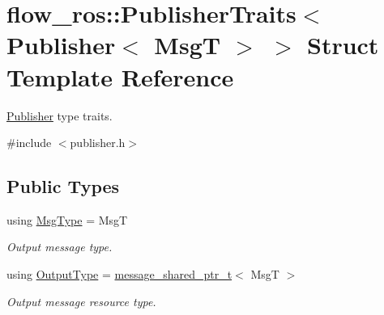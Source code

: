 \hypertarget{structflow__ros_1_1_publisher_traits_3_01_publisher_3_01_msg_t_01_4_01_4}{}\section{flow\+\_\+ros\+:\+:Publisher\+Traits$<$ Publisher$<$ MsgT $>$ $>$ Struct Template Reference}
\label{structflow__ros_1_1_publisher_traits_3_01_publisher_3_01_msg_t_01_4_01_4}


\hyperlink{classflow__ros_1_1_publisher}{Publisher} type traits.  




{\ttfamily \#include $<$publisher.\+h$>$}

\subsection*{Public Types}
\begin{DoxyCompactItemize}
\item 
\mbox{\label{structflow__ros_1_1_publisher_traits_3_01_publisher_3_01_msg_t_01_4_01_4_a000875f649a635cc680ed1751f844d0d}} 
using \hyperlink{structflow__ros_1_1_publisher_traits_3_01_publisher_3_01_msg_t_01_4_01_4_a000875f649a635cc680ed1751f844d0d}{Msg\+Type} = MsgT
\begin{DoxyCompactList}\small\item\em Output message type. \end{DoxyCompactList}\item 
\mbox{\label{structflow__ros_1_1_publisher_traits_3_01_publisher_3_01_msg_t_01_4_01_4_aab638dc9a12c99f992c9022659dec530}} 
using \hyperlink{structflow__ros_1_1_publisher_traits_3_01_publisher_3_01_msg_t_01_4_01_4_aab638dc9a12c99f992c9022659dec530}{Output\+Type} = \hyperlink{namespaceflow__ros_a21a684f38ee2083b3858613317c46d82}{message\+\_\+shared\+\_\+ptr\+\_\+t}$<$ MsgT $>$
\begin{DoxyCompactList}\small\item\em Output message resource type. \end{DoxyCompactList}\end{DoxyCompactItemize}


